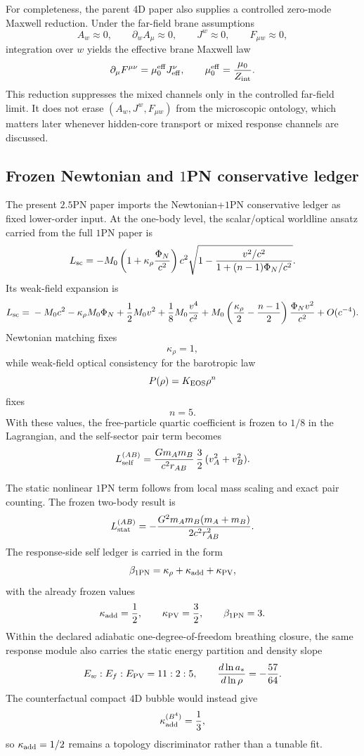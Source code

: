 \documentclass[11pt]{article}
\begin{document}
For completeness, the parent $4$D paper also supplies a controlled zero-mode Maxwell
reduction.  Under the far-field brane assumptions
\[
A_w\approx 0,
\qquad
\partial_w A_\mu\approx 0,
\qquad
J^w\approx 0,
\qquad
F_{\mu w}\approx 0,
\]
integration over $w$ yields the effective brane Maxwell law
\[
\partial_\mu F^{\mu\nu}=\mu_0^{\rm eff}J_{\rm eff}^\nu,
\qquad
\mu_0^{\rm eff}=\frac{\mu_0}{Z_{\rm int}}.
\]
This reduction suppresses the mixed channels only in the controlled far-field limit.  It
does not erase $(A_w,J^w,F_{\mu w})$ from the microscopic ontology, which matters later
whenever hidden-core transport or mixed response channels are discussed.

\subsection{Frozen Newtonian and \texorpdfstring{$1$}{1}PN conservative ledger}
\label{app:imported-lower-order-anchors-1pn}

The present $2.5$PN paper imports the Newtonian+$1$PN conservative ledger as fixed lower-order
input.  At the one-body level, the scalar/optical worldline ansatz carried from the full
$1$PN paper is
\[
L_{\rm sc}
=
-M_0\left(1+\kappa_\rho\frac{\Phi_N}{c^2}\right)c^2
\sqrt{1-
\frac{v^2/c^2}{1+(n-1)\Phi_N/c^2}}.
\]
Its weak-field expansion is
\[
L_{\rm sc}
={}-M_0c^2-\kappa_\rho M_0\Phi_N+\frac12M_0v^2+\frac18M_0\frac{v^4}{c^2}
+M_0\left(\frac{\kappa_\rho}{2}-\frac{n-1}{2}\right)\frac{\Phi_N v^2}{c^2}
+O(c^{-4}).
\]
Newtonian matching fixes
\[
\kappa_\rho=1,
\]
while weak-field optical consistency for the barotropic law
\[
P(\rho)=K_{\rm EOS}\rho^n
\]
fixes
\[
n=5.
\]
With these values, the free-particle quartic coefficient is frozen to $1/8$ in the
Lagrangian, and the self-sector pair term becomes
\[
L_{\rm self}^{(AB)}
=
\frac{Gm_A m_B}{c^2r_{AB}}\,\frac32\,(v_A^2+v_B^2).
\]

The static nonlinear $1$PN term follows from local mass scaling and exact pair counting.
The frozen two-body result is
\[
L_{\rm stat}^{(AB)}
=
-\frac{G^2m_A m_B(m_A+m_B)}{2c^2r_{AB}^2}.
\]
The response-side self ledger is carried in the form
\[
\beta_{\rm 1PN}=\kappa_\rho+\kappa_{\rm add}+\kappa_{\rm PV},
\]
with the already frozen values
\[
\kappa_{\rm add}=\frac12,
\qquad
\kappa_{\rm PV}=\frac32,
\qquad
\beta_{\rm 1PN}=3.
\]
Within the declared adiabatic one-degree-of-freedom breathing closure, the same response
module also carries the static energy partition and density slope
\[
E_w:E_f:E_{\rm PV}=11:2:5,
\qquad
\frac{d\ln a_*}{d\ln\rho}=-\frac{57}{64}.
\]
The counterfactual compact $4$D bubble would instead give
\[
\kappa_{\rm add}^{(B^4)}=\frac13,
\]
so $\kappa_{\rm add}=1/2$ remains a topology discriminator rather than a tunable fit.
\end{document}
